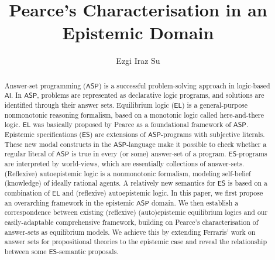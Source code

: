 \documentclass[submission,copyright,creativecommons]{eptcs}
\title{Pearce's Characterisation in an Epistemic Domain}
\author{Ezgi Iraz Su
\institute{Sinop University, Department of Computer Engineering, Sinop, Turkey}
\email{eirazsu@sinop.edu.tr}
}
\newcommand{\logic}[1]  { \ensuremath{\mathsf{#1}} }
\newcommand{\ASP}  { \logic{ASP} }
\newcommand{\EL}  { \logic{EL} }
\newcommand{\ES}  { \logic{ES} }
\newcommand{\AI}  { \logic{AI} }
\begin{document}
\maketitle

\begin{abstract}
Answer-set programming ($\ASP$) is a successful problem-solving approach in logic-based $\AI$. 
In $\ASP$, problems are represented as declarative logic programs, and solutions are
identified through their answer sets. 
Equilibrium logic ($\EL$) is a general-purpose nonmonotonic reasoning formalism, 
based on a monotonic logic called here-and-there logic.  
$\EL$ was basically proposed by Pearce as a foundational framework of $\ASP$. 
Epistemic specifications ($\ES$) are extensions of $\ASP$-programs 
with subjective literals. These new modal constructs in the $\ASP$-language make it possible to check whether a regular literal
of $\ASP$ is true in every (or some) answer-set of a program. $\ES$-programs 
are interpreted by world-views, which are essentially 
collections of answer-sets. (Reflexive) autoepistemic logic is a nonmonotonic formalism, 
modeling self-belief (knowledge) of ideally rational agents. 
A relatively new semantics for $\ES$ is based on a combination of 
$\EL$ and (reflexive) autoepistemic logic. 
In this paper, we first propose an overarching framework in the epistemic $\ASP$ 
domain.  
We then establish a correspondence between existing (reflexive) (auto)epistemic 
equilibrium logics and our easily-adaptable comprehensive framework, 
building on Pearce's characterisation of answer-sets as equilibrium models. 
We achieve this by extending Ferraris' work on answer sets 
for propositional theories to the epistemic case and reveal the relationship 
between some $\ES$-semantic proposals.
\end{abstract}

\end{document}
